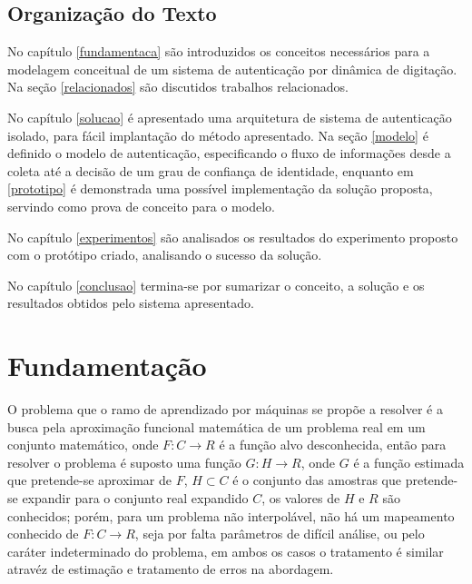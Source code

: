 \documentclass[pfc]{imetex}
\begin{document}
\section{Organização do Texto}
No capítulo \ref{fundamentaca} são introduzidos os conceitos necessários para a modelagem conceitual de um sistema de autenticação por dinâmica de digitação. Na seção \ref{relacionados} são discutidos trabalhos relacionados.

No capítulo \ref{solucao} é apresentado uma arquitetura de sistema de autenticação isolado, para fácil implantação do método apresentado. Na seção \ref{modelo} é definido o modelo de autenticação, especificando o fluxo de informações desde a coleta até a decisão de um grau de confiança de identidade, enquanto em \ref{prototipo} é demonstrada uma possível implementação da solução proposta, servindo como prova de conceito para o modelo.

No capítulo \ref{experimentos} são analisados os resultados do experimento proposto com o protótipo criado, analisando o sucesso da solução.

No capítulo \ref{conclusao} termina-se por sumarizar o conceito, a solução e os resultados obtidos pelo sistema apresentado.

\chapter{Fundamentação}
   O problema que o ramo de aprendizado por máquinas se propõe a resolver é a busca pela aproximação funcional matemática de um problema real em um conjunto matemático, onde $F:C \rightarrow R$ é a função alvo desconhecida, então para resolver o problema é suposto uma função $G:H \rightarrow R$, onde $G$ é a função estimada que pretende-se aproximar de $F$, $H \subset C$ é o conjunto das amostras que pretende-se expandir para o conjunto real expandido $C$, os valores de $H$ e $R$ são conhecidos; porém, para um problema não interpolável, não há um mapeamento conhecido de $F:C \rightarrow R$, seja por falta parâmetros de difícil análise, ou pelo caráter indeterminado do problema, em ambos os casos o tratamento é similar atravéz de estimação e tratamento de erros na abordagem.
    \newline
\end{document}
